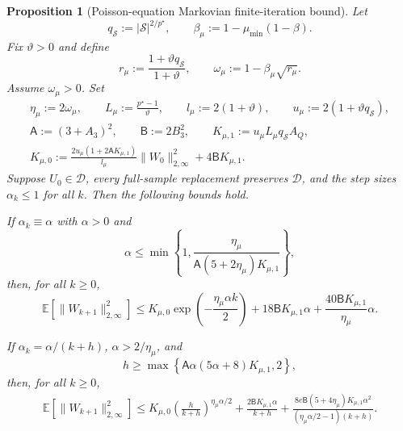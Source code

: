 \documentclass{article}
\newtheorem{proposition}[theorem]{Proposition}
\newcommand{\X}{\mathcal{S}}
\begin{document}
\begin{proposition}[Poisson-equation Markovian finite-iteration bound]
\label{prop:abstract-markov}
Let
\begin{equation}
q_{\X}:=\lvert\X\rvert^{2/p^\star},\qquad
\beta_\mu:=1-\mu_{\min}(1-\beta).
\end{equation}
Fix $\vartheta>0$ and define
\begin{equation}
r_\mu:=\frac{1+\vartheta q_{\X}}{1+\vartheta},\qquad
\omega_\mu:=1-\beta_\mu\sqrt{r_\mu}.
\end{equation}
Assume $\omega_\mu>0$. Set
\begin{equation}
\begin{gathered}
\eta_\mu:=2\omega_\mu,\qquad
L_\mu:=\frac{p^\star-1}{\vartheta},\qquad
l_\mu:=2(1+\vartheta),\qquad
u_\mu:=2(1+\vartheta q_{\X}),\\
\mathsf A:=(3+A_3)^2,\qquad
\mathsf B:=2B_3^2,\qquad
K_{\mu,1}:=u_\mu L_\mu q_{\X}A_Q,\\
K_{\mu,0}:=\frac{2u_\mu(1+2\mathsf A K_{\mu,1})}{l_\mu}\lVert W_0\rVert_{2,\infty}^2+4\mathsf B K_{\mu,1}.
\end{gathered}
\end{equation}
Suppose $U_0\in\mathcal D$, every full-sample replacement preserves $\mathcal D$, and the step sizes $\alpha_k\le 1$ for all $k$. Then the following bounds hold.

If $\alpha_k\equiv\alpha$ with $\alpha>0$ and
\begin{equation}
\alpha\le\min\left\{1,\frac{\eta_\mu}{\mathsf A(5+2\eta_\mu)K_{\mu,1}}\right\},
\end{equation}
then, for all $k\ge0$,
\begin{equation}
\mathbb E\left[\lVert W_{k+1}\rVert_{2,\infty}^2\right]\le
K_{\mu,0}\exp\left(-\frac{\eta_\mu\alpha k}{2}\right)
+18\mathsf B K_{\mu,1}\alpha+\frac{40\mathsf B K_{\mu,1}}{\eta_\mu}\alpha.
\end{equation}

If $\alpha_k=\alpha/(k+h)$, $\alpha>2/\eta_\mu$, and
\begin{equation}
h\ge\max\left\{\mathsf A\alpha(5\alpha+8)K_{\mu,1},2\right\},
\end{equation}
then, for all $k\ge0$,
\begin{equation}
\begin{gathered}
\mathbb E\left[\lVert W_{k+1}\rVert_{2,\infty}^2\right]\le
K_{\mu,0}\left(\frac{h}{k+h}\right)^{\eta_\mu\alpha/2}
+\frac{2\mathsf B K_{\mu,1}\alpha}{k+h}
+\frac{8e\mathsf B(5+4\eta_\mu)K_{\mu,1}\alpha^2}{(\eta_\mu\alpha/2-1)(k+h)}.
\end{gathered}
\end{equation}


\end{proposition}
\end{document}
